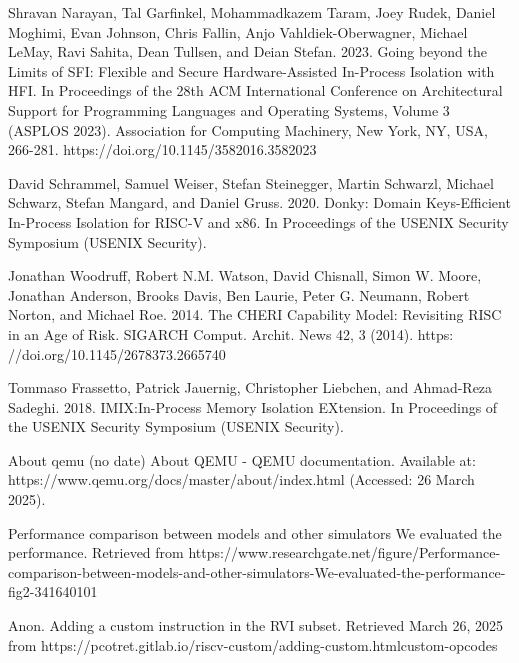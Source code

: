 \documentclass[conference,compsoc]{IEEEtran}
\begin{document}
\begin{thebibliography}{1}

Shravan Narayan, Tal Garfinkel, Mohammadkazem Taram, Joey Rudek, Daniel Moghimi, Evan Johnson, Chris Fallin, Anjo Vahldiek-Oberwagner, Michael LeMay, Ravi Sahita, Dean Tullsen, and Deian Stefan. 2023. Going beyond the Limits of SFI: Flexible and Secure Hardware-Assisted In-Process Isolation with HFI. In Proceedings of the 28th ACM International Conference on Architectural Support for Programming Languages and Operating Systems, Volume 3 (ASPLOS 2023). Association for Computing Machinery, New York, NY, USA, 266-281. https://doi.org/10.1145/3582016.3582023

David Schrammel, Samuel Weiser, Stefan Steinegger, Martin Schwarzl, Michael
Schwarz, Stefan Mangard, and Daniel Gruss. 2020. Donky: Domain Keys-Efficient
In-Process Isolation for RISC-V and x86. In Proceedings of the USENIX Security
Symposium (USENIX Security).

Jonathan Woodruff, Robert N.M. Watson, David Chisnall, Simon W. Moore,
Jonathan Anderson, Brooks Davis, Ben Laurie, Peter G. Neumann, Robert Norton, and Michael Roe. 2014. The CHERI Capability Model: Revisiting RISC
in an Age of Risk. SIGARCH Comput. Archit. News 42, 3 (2014). https:
//doi.org/10.1145/2678373.2665740

Tommaso Frassetto, Patrick Jauernig, Christopher Liebchen, and Ahmad-Reza
Sadeghi. 2018. IMIX:In-Process Memory Isolation EXtension. In Proceedings of
the USENIX Security Symposium (USENIX Security).

About qemu (no date) About QEMU - QEMU documentation. Available at: https://www.qemu.org/docs/master/about/index.html (Accessed: 26 March 2025). 

Performance comparison between models and other simulators We evaluated the performance. Retrieved from https://www.researchgate.net/figure/Performance-comparison-between-models-and-other-simulators-We-evaluated-the-performance-fig2-341640101

Anon. Adding a custom instruction in the RVI subset. Retrieved March 26, 2025 from https://pcotret.gitlab.io/riscv-custom/adding-custom.htmlcustom-opcodes 

\end{thebibliography}




\end{document}
